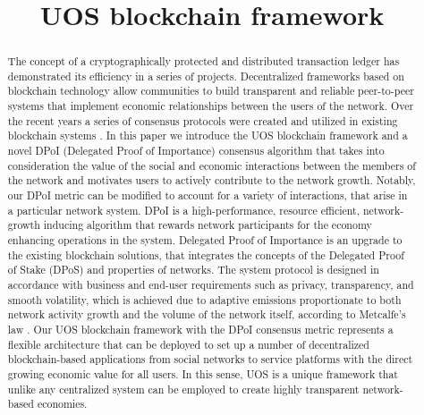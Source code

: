 \documentclass[a4paper,12pt]{article}
\title{U{\degree}OS blockchain framework}
\author{}
\begin{document}
\clearpage\maketitle
\thispagestyle{empty}


\clearpage\tableofcontents
\setcounter{page}{1}


\clearpage
\begin{abstract}

The concept of a cryptographically protected and distributed transaction ledger has demonstrated its efficiency in a series of projects. Decentralized frameworks based on blockchain technology allow communities to build transparent and reliable peer-to-peer systems that implement economic relationships between the users of the network. Over the recent years a series of consensus protocols were created and utilized in existing blockchain systems \cite{satoshi, dantheman, nem, dbft, poa}. In this paper we introduce the U{\degree}OS blockchain framework and a novel DPoI (Delegated Proof of Importance) consensus algorithm that takes into consideration the value of the social and economic interactions between the members of the network and motivates users to actively contribute to the network growth. Notably, our DPoI metric can be modified to account for a variety of interactions, that arise in a particular network system. DPoI is a high-performance, resource efficient, network-growth inducing algorithm that rewards network participants for the economy enhancing operations in the system. Delegated Proof of Importance is an upgrade to the existing blockchain solutions, that integrates the concepts of the Delegated Proof of Stake (DPoS) and properties of networks. The system protocol is designed in accordance with business and end-user requirements such as privacy, transparency, and smooth volatility, which is achieved due to adaptive emissions proportionate to both network activity growth and the volume of the network itself, according to Metcalfe's law \cite{Metcalfe}. Our U{\degree}OS blockchain framework with the DPoI consensus metric represents a flexible architecture that can be deployed to set up a number of decentralized blockchain-based applications from social networks to service platforms with the direct growing economic value for all users. In this sense, U{\degree}OS is a unique framework that unlike any centralized system can be employed to create highly transparent network-based economies.



\end{abstract}
\end{document}
